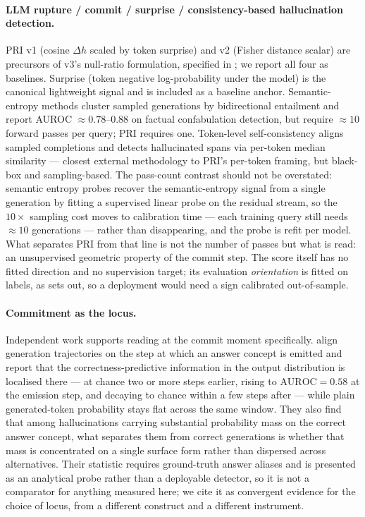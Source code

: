 \documentclass[10pt, letterpaper]{article}
\renewcommand{\dh}{\Delta h}
\newcommand{\auroc}{\text{AUROC}}
\begin{document}
\paragraph{LLM rupture / commit / surprise / consistency-based
hallucination detection.}
PRI v1 (cosine $\dh$ scaled by token surprise)
and v2 (Fisher distance scalar) are
precursors of v3's null-ratio formulation, specified in
; we report all four as
baselines. Surprise (token negative
log-probability under the model) is the canonical lightweight signal
and is included as a baseline anchor. Semantic-entropy methods
\citep{farquhar2024semantic} cluster sampled generations by
bidirectional entailment and report AUROC $\approx 0.78$--$0.88$ on
factual confabulation detection, but require $\approx 10$ forward
passes per query; PRI requires one. Token-level self-consistency
\citep{wastl2025token} aligns sampled completions and detects
hallucinated spans via per-token median similarity --- closest
external methodology to PRI's per-token framing, but black-box and
sampling-based. The pass-count contrast should not be overstated:
semantic entropy probes \citep{kossen2024sep} recover the
semantic-entropy signal from a single generation by fitting a
supervised linear probe on the residual stream, so the $10\times$
sampling cost moves to calibration time --- each training query still
needs $\approx 10$ generations --- rather than disappearing, and the
probe is refit per model. What separates PRI from that line is not the
number of passes but what is read: an unsupervised geometric property
of the commit step. The score itself has no fitted direction and no
supervision target; its evaluation \emph{orientation} is fitted on
labels, as  sets out, so a deployment would
need a sign calibrated out-of-sample.

\paragraph{Commitment as the locus.} Independent work supports reading
at the commit moment specifically. \citet{yeom2026commitment} align
generation trajectories on the step at which an answer concept is
emitted and report that the correctness-predictive information in the
output distribution is localised there --- at chance two or more steps
earlier, rising to $\auroc = 0.58$ at the emission step, and decaying
to chance within a few steps after --- while plain generated-token
probability stays flat across the same window. They also find that
among hallucinations carrying substantial probability mass on the
correct answer concept, what separates them from correct generations is
whether that mass is concentrated on a single surface form rather than
dispersed across alternatives. Their statistic requires ground-truth
answer aliases and is presented as an analytical probe rather than a
deployable detector, so it is not a comparator for anything measured
here; we cite it as convergent evidence for the choice of locus, from a
different construct and a different instrument.
\end{document}
